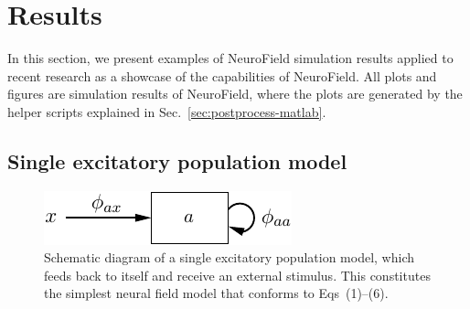 \documentclass[preprint,review,10pt,authoryear,letterpaper]{elsarticle}
\begin{document}
%
%
%
%
%


\section{Results}
\label{sec:results}

In this section, we present examples of NeuroField simulation results applied to recent research as a showcase of the capabilities of NeuroField. All plots and figures are simulation results of NeuroField, where the plots are generated by the helper scripts explained in Sec.~\ref{sec:postprocess-matlab}.

\subsection{Single excitatory population model}
\label{sec:wave}

\begin{figure}[t]
\begin{center}
\includegraphics[width=0.50\columnwidth]{one-pop}
\caption{Schematic diagram of a single excitatory population model, which feeds back to itself and receive an external stimulus. This constitutes the simplest neural field model that conforms to Eqs~(1)--(6).}
\label{fig:ct_schematic}
\end{center}
\end{figure}
\end{document}
